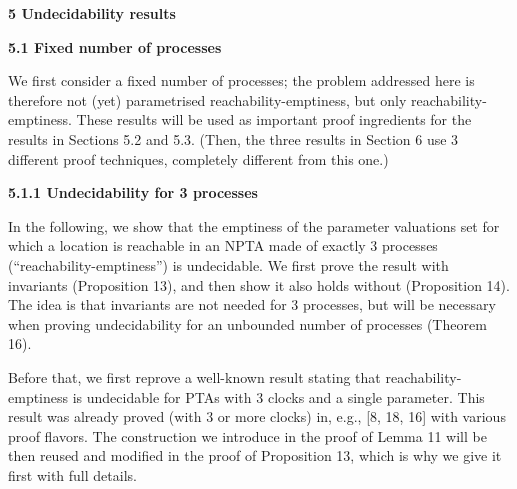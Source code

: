 \documentclass[10pt,a4paper]{article}
\begin{document}
 
 
 


 
\par\medskip\noindent\textbf{5 Undecidability results}\par
 
 
\par\medskip\noindent\textbf{5.1 Fixed number of processes}\par
 
 
We first consider a fixed number of processes; the problem addressed here is therefore not (yet) parametrised reachability-emptiness, but only reachability-emptiness. These results will be used as important proof ingredients for the results in Sections 5.2 and 5.3. (Then, the three results in Section 6 use 3 different proof techniques, completely different from this one.)\par
 
 
 
\par\medskip\noindent\textbf{5.1.1 Undecidability for 3 processes}\par
 
 
In the following, we show that the emptiness of the parameter valuations set for which a location is reachable in an NPTA made of exactly 3 processes (“reachability-emptiness”) is undecidable. We first prove the result with invariants (Proposition 13), and then show it also holds without (Proposition 14). The idea is that invariants are not needed for 3 processes, but will be necessary when proving undecidability for an unbounded number of processes (Theorem 16).\par
 
 
 
Before that, we first reprove a well-known result stating that reachability-emptiness is undecidable for PTAs with 3 clocks and a single parameter. This result was already proved (with 3 or more clocks) in, e.g., [8, 18, 16] with various proof flavors. The construction we introduce in the proof of Lemma 11 will be then reused and modified in the proof of Proposition 13, which is why we give it first with full details.\par
 
\end{document}
